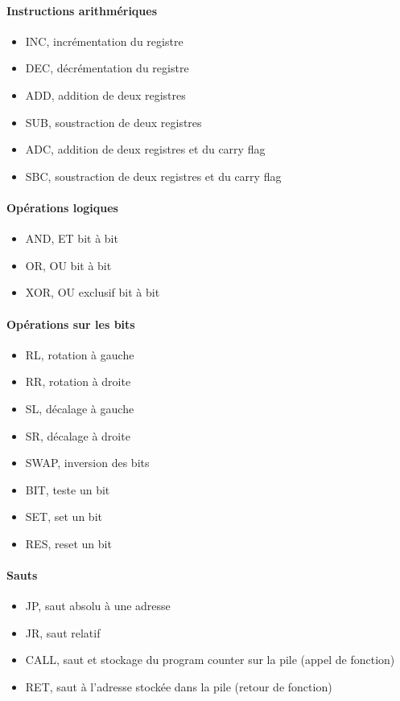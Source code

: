 \documentclass[a4paper]{article}
\begin{document}
\paragraph{Instructions arithmériques}
\begin{itemize}[label=\textbullet]
	\item INC, incrémentation du registre
	\item DEC, décrémentation du registre
	\item ADD, addition de deux registres
	\item SUB, soustraction de deux registres
	\item ADC, addition de deux registres et du carry flag
	\item SBC, soustraction de deux registres et du carry flag
\end{itemize}
\paragraph{Opérations logiques}
\begin{itemize}[label=\textbullet]
	\item AND, ET bit à bit
	\item OR, OU bit à bit
	\item XOR, OU exclusif bit à bit
\end{itemize}
\paragraph{Opérations sur les bits}
\begin{itemize}[label=\textbullet]
	\item RL, rotation à gauche
	\item RR, rotation à droite
	\item SL, décalage à gauche
	\item SR, décalage à droite
	\item SWAP, inversion des bits
	\item BIT, teste un bit
	\item SET, set un bit
	\item RES, reset un bit
\end{itemize}
\paragraph{Sauts}
\begin{itemize}[label=\textbullet]
	\item JP, saut absolu à une adresse
	\item JR, saut relatif
	\item CALL, saut et stockage du program counter sur la pile (appel de fonction)
	\item RET, saut à l'adresse stockée dans la pile (retour de fonction)
\end{itemize}
\end{document}

